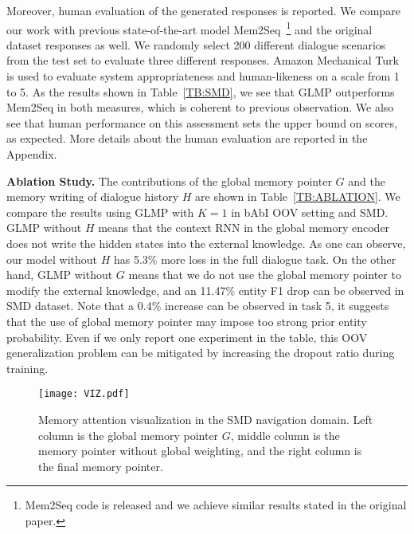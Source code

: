 \documentclass{article} \usepackage{iclr2019_conference,times}
\begin{document}
Moreover, human evaluation of the generated responses is reported. We compare our work with previous state-of-the-art model Mem2Seq~\footnote{Mem2Seq code is released and we achieve similar results stated in the original paper.} and the original dataset responses as well. We randomly select 200 different dialogue scenarios from the test set to evaluate three different responses. Amazon Mechanical Turk is used to evaluate system appropriateness and human-likeness on a scale from 1 to 5. As the results shown in Table~\ref{TB:SMD}, we see that GLMP outperforms Mem2Seq in both measures, which is coherent to previous observation. We also see that human performance on this assessment sets the upper bound on scores, as expected. More details about the human evaluation are reported in the Appendix.

\textbf{Ablation Study. }
The contributions of the global memory pointer $G$ and the memory writing of dialogue history $H$ are shown in Table~\ref{TB:ABLATION}. We compare the results using GLMP with $K = 1$ in bAbI OOV setting and SMD. GLMP without $H$ means that the context RNN in the global memory encoder does not write the hidden states into the external knowledge. As one can observe, our model without $H$ has 5.3\% more loss in the full dialogue task. On the other hand, GLMP without $G$ means that we do not use the global memory pointer to modify the external knowledge, and an 11.47\% entity F1 drop can be observed in SMD dataset. Note that a 0.4\% increase can be observed in task 5, it suggests that the use of global memory pointer may impose too strong prior entity probability. Even if we only report one experiment in the table, this OOV generalization problem can be mitigated by increasing the dropout ratio during training. 


\begin{figure}[t]
\centering
\texttt{[image: VIZ.pdf]} \setlength{\abovecaptionskip}{-5pt} 
\setlength{\belowcaptionskip}{-10pt} 
\caption{Memory attention visualization in the SMD navigation domain. Left column is the global memory pointer $G$, middle column is the memory pointer without global weighting, and the right column is the final memory pointer.}
\label{FIG:VIZ}
\end{figure}
\end{document}
